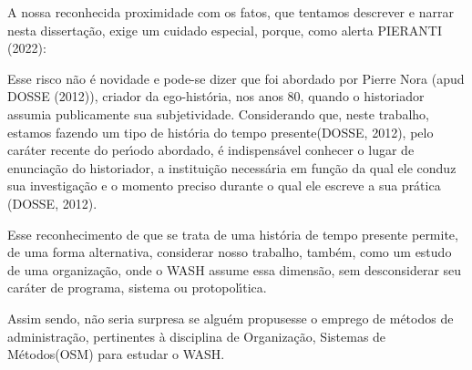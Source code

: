 \documentclass[
12pt,		%
openright,	%
twoside,  %
a4paper,			%
chapter=TITLE,		%
english,			%
french,				%
spanish,			%
brazil				%
]{USPSC-classe/USPSC}
\begin{document}
A nossa reconhecida proximidade com os fatos, que tentamos descrever e narrar nesta disserta\c{c}\~ao, exige um cuidado especial, porque, como alerta  PIERANTI (2022):









\noindent\begin{center}\mbox{\centering{}}\end{center}


Esse risco n\~ao \'e novidade e pode-se dizer que foi abordado por Pierre Nora  (apud DOSSE (2012)), criador da ego-hist\'oria, nos anos 80, quando o historiador assumia publicamente sua subjetividade. Considerando que, neste trabalho, estamos fazendo um tipo de \textquotedbl hist\'oria do tempo presente\textquotedbl   (DOSSE, 2012), pelo car\'ater recente do per\'{\i}odo abordado, \'e indispens\'avel \textquotedbl conhecer o lugar de enuncia\c{c}\~ao do historiador, a institui\c{c}\~ao necess\'aria em fun\c{c}\~ao da qual ele conduz sua investiga\c{c}\~ao e o momento preciso durante o qual ele escreve a sua pr\'atica \textquotedbl   (DOSSE, 2012).








Esse reconhecimento de que se trata de uma hist\'oria de tempo presente permite, de uma forma alternativa, considerar nosso trabalho, tamb\'em, como um estudo de uma organiza\c{c}\~ao, onde o WASH assume essa dimens\~ao, sem desconsiderar seu car\'ater de  programa, sistema ou protopol\'{\i}tica.








Assim sendo, n\~ao seria surpresa se algu\'em propusesse o emprego de m\'etodos de administra\c{c}\~ao, pertinentes \`a disciplina de \textquotedbl Organiza\c{c}\~ao, Sistemas de M\'etodos\textquotedbl  (OSM) para estudar o WASH.
\end{document}
